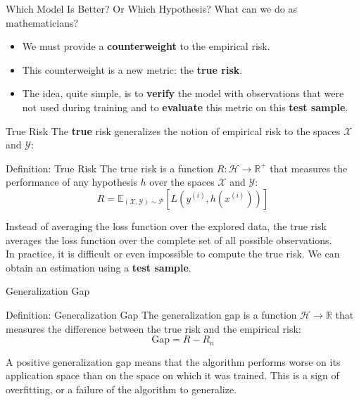 \begin{frame}{Which Model Is Better? Or Which Hypothesis?}
	What can we do as mathematicians?
	\begin{itemize}
		\item We must provide a \textbf{counterweight} to the empirical risk.
		\pause
		\item This counterweight is a new metric: the \textbf{true risk}.
		\pause
		\item The idea, quite simple, is to \textbf{verify} the model with observations that were not used during training and to \textbf{evaluate} this metric on this \textbf{test sample}. 
	\end{itemize}
\end{frame}

\begin{frame}{True Risk}
	The \textbf{true} risk generalizes the notion of empirical risk to the spaces $\mathcal{X}$ and $\mathcal{Y}$:
	\begin{block}{Definition: True Risk}
		The true risk is a function $R: \mathcal{H} \to \mathbb{R}^+$ that measures the performance of any hypothesis $h$ over the spaces $\mathcal{X}$ and $\mathcal{Y}$:
		\begin{equation}
			R = \mathbb{E}_{(\mathcal{X}, \mathcal{Y}) \sim \mathcal{P}}\left[L\left(y^{(i)}, h\left(x^{(i)}\right)\right)\right]
			\nonumber
		\end{equation}
		\hfill
	\end{block}
	\pause
	Instead of averaging the loss function over the explored data, the true risk averages the loss function over the complete set of all possible observations. \\
	\pause
	In practice, it is difficult or even impossible to compute the true risk. We can obtain an estimation using a \textbf{test sample}.
\end{frame}

\begin{frame}{Generalization Gap}
	\begin{block}{Definition: Generalization Gap}
		The generalization gap is a function $\mathcal{H} \to \mathbb{R}$ that measures the difference between the true risk and the empirical risk:
		\begin{equation*}
			\text{Gap} = R - R_n
		\end{equation*}
		\hfill
	\end{block}
	\pause
	A positive generalization gap means that the algorithm performs worse on its application space than on the space on which it was trained. This is a sign of overfitting, or a failure of the algorithm to generalize.
\end{frame}
	
